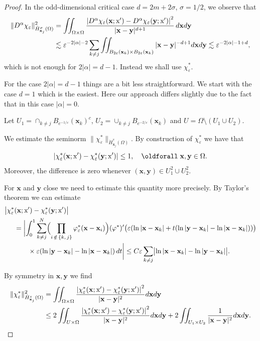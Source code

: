 \documentclass[10pt]{amsart}
\theoremstyle{definition}\newtheorem{defi}[theo]{Definition}\newtheorem{rema}[theo]{Remark}\newtheorem{exam}[theo]{Example}\newtheorem{exem}[theo]{Example}\newtheorem{nota}[theo]{Notation}
\newcommand*\eps{\varepsilon}
\newcommand\1{{\ensuremath {\mathds 1} }}
\newcommand{\bx}{\mathbf{x}}
\newcommand{\by}{\mathbf{y}}
\newcommand{\sx}{\textup{x}}
\renewcommand*{\forall}{\mathrel{\oldforall}}
\begin{document}
\begin{proof}
In the odd-dimensional critical case $d=2m+2\sigma$, $\sigma = 1/2$, we observe that
\begin{align*}
\|D^\alpha \chi_\eps\|_{\dot{H}^\sigma_{\bx_j}(\Omega)}^2 &= \iint_{\Omega \times \Omega} \dfrac{\left|D^\alpha\chi_\eps(\bx;\sx') - D^\alpha\chi_\eps(\by;\sx')\right|^2}{|\bx-\by|^{d+1}}\,d\bx d\by \\
&\lesssim \eps^{-2|\alpha|-2} \sum_{k \neq j} \iint_{B_{2\eps}(\bx_k) \times B_{2\eps}(\bx_k)} |\bx - \by|^{-d+1} d\bx d\by
\lesssim \eps^{-2|\alpha|-1+d},
\end{align*}
which is not enough for $2|\alpha|=d-1$. Instead we shall use $\chi_\eps^*$.



For the case $2|\alpha|=d-1$ things are a bit less straightforward. We start with the case $d=1$ which is the easiest. Here our approach differs slightly due to the fact that in this case $|\alpha|=0$.

Let $U_1=\cap_{k\neq j} B_{e^{-1/\eps}}(\bx_k)^c$, $U_2= \cup_{k\neq j} B_{e^{-2/\eps}}(\bx_k)$ and $U= \Omega\setminus(U_1\cup U_2)$.

We estimate the seminorm $\|\chi_\eps^*\|_{\dot H^s_{\bx_j}(\Omega)}$. By construction of $\chi_\eps^{*}$ we have that
\begin{equation*}
\left|\chi_\eps^*(\bx; \sx')-\chi_\eps^*(\by; \sx')\right|\leq 1, \quad \forall \bx, \by \in \Omega.
\end{equation*}
Moreover, the difference is zero whenever $(\bx, \by) \in U_1^2 \cup U_2^2$.

For $\bx$ and $\by$ close we need to estimate this quantity more precisely. By Taylor's theorem we can estimate
\begin{align*}
\bigl|\chi_\eps^*&(\bx; \sx') - \chi_\eps^*(\by; \sx')\bigr|\\
&=
\biggl|
\int_0^1 \sum_{k\neq j}^{N}\Bigl(\prod_{i\,\notin\,\{k,\,j\}} \varphi^{*}_\eps(\bx-\bx_i)\Bigr)(\varphi^*)'\bigl(\eps(\ln|\bx-\bx_k|+t(\ln|\by-\bx_k|-\ln|\bx-\bx_k|))\bigr)\\
&\qquad\times \eps(\ln|\by-\bx_k|-\ln|\bx-\bx_k|)\,dt\biggr|
\leq C \eps \sum_{k\neq j}\bigl|{\ln|\bx-\bx_k|-\ln|\by-\bx_k|}\bigr|.
\end{align*}

By symmetry in $\bx, \by$ we find
\begin{equation}\label{eq:cc_integral_1D}
\begin{aligned}
\|\chi_\eps^*\|_{\dot H^s_{\bx_j}(\Omega)}^2 &=
\iint_{\Omega\times\Omega} \frac{\left|\chi_\eps^*(\bx; \sx')-\chi_\eps^*(\by; \sx')\right|^2}{|\bx-\by|^2}d\bx d\by\\
&\leq 2\iint_{U\times \Omega}\frac{\left|\chi_\eps^*(\bx; \sx')-\chi_\eps^*(\by; \sx')\right|^2}{|\bx-\by|^2}d\bx d\by + 2\iint_{U_1\times U_2}\frac{1}{|\bx-\by|^2}d\bx d\by.
\end{aligned}
\end{equation}


\end{proof}
\end{document}
